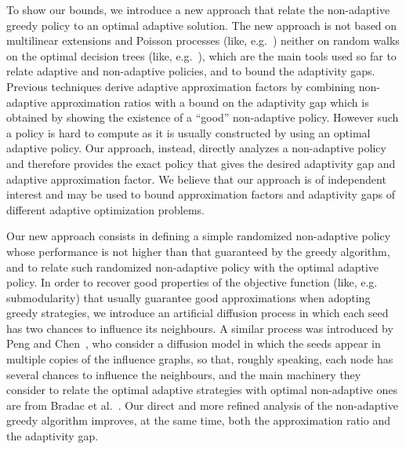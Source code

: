 To show our bounds, we introduce a new approach that relate the non-adaptive greedy policy to an optimal adaptive solution. The new approach is not based on multilinear extensions and Poisson processes (like, e.g.~\cite{Asadpour16,Calinescu11,CVZ14,Chen2019}) neither on random walks on the optimal decision trees (like, e.g.~\cite{Bradac19,Gupta2016,Gupta2017,Peng2019}), which are the main tools used so far to relate adaptive and non-adaptive policies, and to bound the adaptivity gaps. Previous techniques derive adaptive approximation factors by combining non-adaptive approximation ratios with a bound on the adaptivity gap which is obtained by showing the existence of a ``good'' non-adaptive policy. However such a policy is hard to compute as it is usually  constructed by using an optimal adaptive policy. Our approach, instead, directly analyzes a non-adaptive policy and therefore provides the exact policy that gives the desired adaptivity gap and adaptive approximation factor. We believe that our approach is of independent interest and may be used to bound approximation factors and adaptivity gaps of different adaptive optimization problems. 

Our new approach consists in defining a simple randomized non-adaptive policy whose performance is not higher than that guaranteed by the greedy algorithm, and to relate such randomized non-adaptive policy with the optimal adaptive policy. In order to recover good properties of the objective function (like, e.g. submodularity) that usually guarantee good approximations when adopting  greedy strategies, we introduce an artificial diffusion process in which each seed has two chances to influence its neighbours. A similar process was introduced by Peng and Chen~\cite{Peng2019}, who consider a diffusion model in which the seeds appear in multiple copies of the influence graphs, so that, roughly speaking, each node has several chances to influence the neighbours, and the main machinery they consider to relate the optimal adaptive strategies with optimal non-adaptive ones are from Bradac et al.~\cite{Bradac19}.
Our direct and more refined analysis of the non-adaptive greedy algorithm improves, at the same time, both the approximation ratio and the adaptivity gap. 

